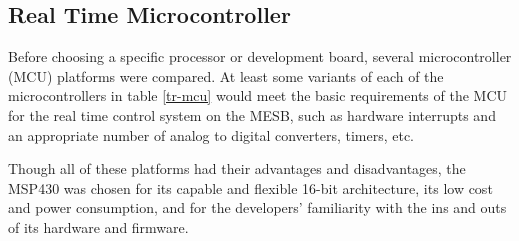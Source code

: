 \documentclass[letterpaper,12pt]{article}
\begin{document}
\subsection{Real Time Microcontroller}
Before choosing a specific processor or development board, several microcontroller (MCU) platforms were compared. At least some variants of each of the microcontrollers in table \ref{tr-mcu} would meet the basic requirements of the MCU for the real time control system on the MESB, such as hardware interrupts and an appropriate number of analog to digital converters, timers, etc.
\begin{table}[!htbp]
\caption{Real Time Microcontroller Trade Study}
\label{tr-mcu}
\end{table}
Though all of these platforms had their advantages and disadvantages, the MSP430 was chosen for its capable and flexible 16-bit architecture, its low cost and power consumption, and for the developers' familiarity with the ins and outs of its hardware and firmware.
\end{document}
